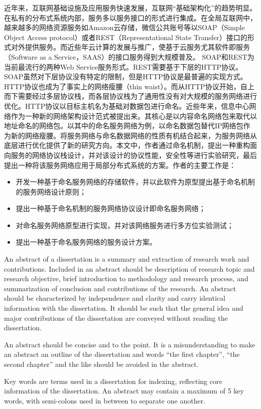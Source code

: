 \begin{cabstract}
   近年来，互联网基础设施及应用服务快速发展，互联网“基础架构化”的趋势明显。在私有的分布式系统内部，服务多以服务接口的形式进行集成。在全局互联网中，越来越多的网络资源服务如Amazon云存储，微信公共账号等以SOAP（Simple Object Access protocol）或者REST（Representational State Transfer）接口的形式对外提供服务。而近些年云计算的发展与推广，使基于云服务尤其软件即服务（Software as a Service，SAAS）的接口服务得到大规模普及。
   SOAP和REST为当前最流行的两种Web Service服务形式。REST需要基于下层的HTTP协议。SOAP虽然对下层协议没有特定的限制，但是HTTP协议是最普遍的实现方式。HTTP协议也成为了事实上的网络瘦腰（thin waist）。而从HTTP协议开始，自上而下需要经过多层协议栈，而各层协议栈为了通用性没有对大规模的服务网络进行优化。HTTP协议以目标主机名为基础对数据包进行命名。近些年来，信息中心网络作为一种新的网络架构设计范式被提出来。其核心是以内容命名网络包来取代以地址命名的网络包。以其中的命名服务网络为例，以命名数据包替代IP网络包作为新的网络瘦腰。将服务网络与命名数据网络的性质有机结合起来，为服务网络从底层进行优化提供了新的研究方向。本文中，作者通过命名机制，提出一种重构面向服务的网络协议栈设计，并对该设计的协议性能，安全性等进行实验研究，最后提出一种将该服务网络应用于局部分布式系统的方案。作者的主要工作是：
  \begin{itemize}
    \item 开发一种基于命名服务网络的存储软件，并以此软件为原型提出基于命名机制的服务网络设计原则；
    \item 提出一种基于命名机制的服务网络协议设计即命名服务网络；
    \item 对命名服务网络原型进行实现，并对该网络服务进行多方位实验测试；
    \item 提出一种基于命名服务网络的服务设计方案。
  \end{itemize}
\end{cabstract}


\begin{eabstract} 
   An abstract of a dissertation is a summary and extraction of research work
   and contributions. Included in an abstract should be description of research
   topic and research objective, brief introduction to methodology and research
   process, and summarization of conclusion and contributions of the
   research. An abstract should be characterized by independence and clarity and
   carry identical information with the dissertation. It should be such that the
   general idea and major contributions of the dissertation are conveyed without
   reading the dissertation. 

   An abstract should be concise and to the point. It is a misunderstanding to
   make an abstract an outline of the dissertation and words ``the first
   chapter'', ``the second chapter'' and the like should be avoided in the
   abstract.

   Key words are terms used in a dissertation for indexing, reflecting core
   information of the dissertation. An abstract may contain a maximum of 5 key
   words, with semi-colons used in between to separate one another.
\end{eabstract}

